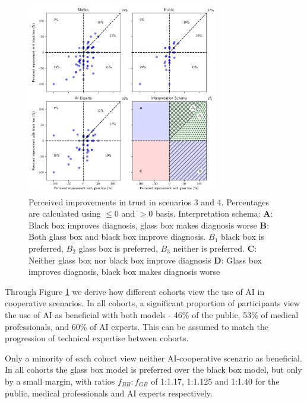 \documentclass[manuscript,screen,review]{acmart}
\begin{document}
\begin{figure}[h!]
    \centering
    \includegraphics[width=0.75\textwidth]{graphics/Doctor_improvements_cooperation_scatter.jpg}
    \caption{\centering Perceived improvements in trust in scenarios 3 and 4. Percentages are calculated using $\leq 0$ and $>0$ basis.\hspace{\textwidth} Interpretation schema: \textbf{A}: Black box improves diagnosis, glass box makes diagnosis worse \hspace{\textwidth} \textbf{B}: Both glass box and black box improve diagnosis. \textbf{$B_1$} black box is preferred, \textbf{$B_2$} glass box is preferred, $B_3$ neither is preferred. \textbf{C}: Neither glass box nor black box improve diagnosis \textbf{D}: Glass box improves diagnosis, black box makes diagnosis worse}
    \label{fig:improvement}
\end{figure}

Through Figure \ref{fig:improvement} we derive how different cohorts view the use of AI in cooperative scenarios. In all cohorts, a significant proportion of participants view the use of AI as beneficial with both models - 46\% of the public, 53\% of medical professionals, and 60\% of AI experts. This can be assumed to match the progression of technical expertise between cohorts.

Only a minority of each cohort view neither AI-cooperative scenario as beneficial. In all cohorts the glass box model is preferred over the black box model, but only by a small margin, with ratios $f_{BB}:f_{GB}$ of 1:1.17, 1:1.125 and 1:1.40 for the public, medical professionals and AI experts respectively. 
\end{document}
